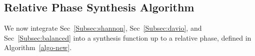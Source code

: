 




\subsection{Relative Phase Synthesis Algorithm}
\label{Subsec:Pro:Improved}
We now integrate Sec~\ref{Subsec:shannon}, Sec~\ref{Subsec:davio}, and Sec~\ref{Subsec:balanced}
into a synthesis function up to a relative phase, defined in Algorithm~\ref{algo-new}.

